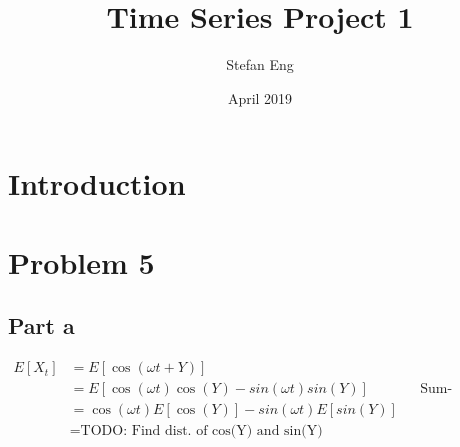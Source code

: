 \documentclass{article}
\title{Time Series Project 1}
\author{Stefan Eng }
\date{April 2019}
\begin{document}
\maketitle

\section{Introduction}
\cite{bd}

\section*{Problem 5}
\subsection*{Part a}
\begin{align*}
    E[X_t] &= E[\cos(\omega t + Y)]\\
    &= E[\cos(\omega t) \cos(Y) - sin(\omega t) sin(Y)] && \text{Sum-difference for cos}\\
    &= \cos(\omega t) E[\cos(Y)] - sin(\omega t) E[sin(Y)]\\
    &= \text{TODO: Find dist. of cos(Y) and sin(Y)}
\end{align*}



\end{document}

